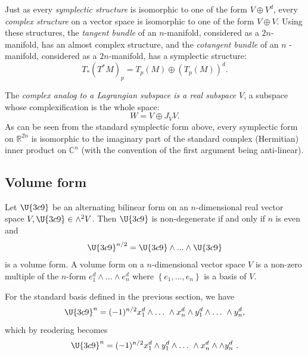 \documentclass{conm-p-l}
\theoremstyle{definition}
\theoremstyle{remark}
\numberwithin{equation}{section}
\theoremstyle{plain}
\begin{document}
Just as every \emph{symplectic structure} is isomorphic to one of the form $%
V\oplus V^{d}$, every \emph{complex structure} on a vector space is
isomorphic to one of the form $V\oplus V$. Using these structures, the \emph{%
tangent bundle} of an $n$-manifold, considered as a $2n$-manifold, has an
almost complex structure, and the \emph{cotangent bundle} of an $n$%
-manifold, considered as a $2n$-manifold, has a symplectic structure: 
\begin{equation}
T_{\ast }(T^{\ast }M)_{p}=T_{p}(M)\oplus (T_{p}(M))^{d}.
\end{equation}

The \emph{complex analog to a Lagrangian subspace is a real subspace }$V$, a
subspace whose complexification is the whole space:%
\begin{equation}
W=V\oplus J_{V}V.
\end{equation}
As can be seen from the standard symplectic form above, every symplectic
form on $\mathbb{R}^{2n}$ is isomorphic to the imaginary part of the
standard complex (Hermitian) inner product on $\mathbb{C}^{n}$ (with the
convention of the first argument being anti-linear).

\subsection{Volume form}

Let $\U{3c9} $ be an alternating bilinear form on an $n$-dimensional real
vector space $V,\U{3c9} \in \wedge ^{2}V$. Then $\U{3c9} $ is non-degenerate
if and only if $n$ is even and 
\begin{equation}
\U{3c9} ^{n/2}=\U{3c9} \wedge ...\wedge \U{3c9} 
\end{equation}
is a volume form. A volume form on a $n$-dimensional vector space $V$ is a
non-zero multiple of the $n$-form $e_{1}^{d}\wedge ...\wedge e_{n}^{d}$
where $\left\{ e_{1},...,e_{n}\right\} $ is a basis of $V$.

For the standard basis defined in the previous section, we have%
\begin{equation}
\U{3c9} ^{n}=(-1)^{n/2}x_{1}^{d}\wedge \ldots \ \wedge x_{n}^{d}\wedge
y_{1}^{d}\wedge \ldots \ \wedge y_{n}^{d},
\end{equation}%
which by reodering becomes 
\begin{equation}
\U{3c9} ^{n}=(-1)^{n/2}x_{1}^{d}\wedge y_{1}^{d}\wedge \ldots \ \wedge
x_{n}^{d}\wedge \wedge y_{n}^{d}\ .
\end{equation}
\end{document}
